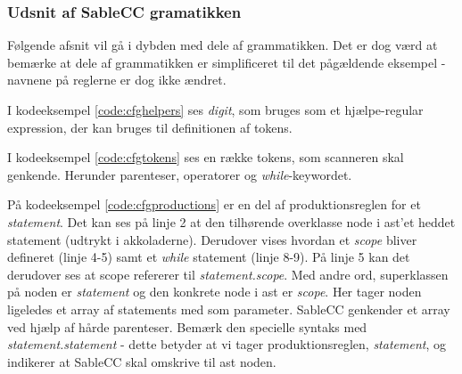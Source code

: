 \subsubsection*{Udsnit af SableCC gramatikken}
Følgende afsnit vil gå i dybden med dele af grammatikken. Det er dog værd at bemærke at dele af grammatikken er simplificeret til det pågældende eksempel - navnene på reglerne er dog ikke ændret.





\noindent I kodeeksempel \ref{code:cfghelpers} ses \textit{digit}, som bruges som et hjælpe-regular expression, der kan bruges til definitionen af tokens.


\noindent I kodeeksempel \ref{code:cfgtokens} ses en række tokens, som scanneren skal genkende. Herunder parenteser, operatorer og \textit{while}-keywordet.


\noindent På kodeeksempel \ref{code:cfgproductions} er en del af produktionsreglen for et \textit{statement}. Det kan ses på linje 2 at den tilhørende overklasse node i \gls{ast}'et heddet statement (udtrykt i akkoladerne). Derudover vises hvordan et \textit{scope} bliver defineret (linje 4-5) samt et \textit{while} statement (linje 8-9). På linje 5 kan det derudover ses at scope refererer til \textit{statement.scope}. Med andre ord, superklassen på noden er \textit{statement} og den konkrete node i \gls{ast} er \textit{scope}. Her tager noden ligeledes et array af statements med som parameter. SableCC genkender et array ved hjælp af hårde parenteser. Bemærk den specielle syntaks med \textit{statement.statement} - dette betyder at vi tager produktionsreglen, \textit{statement}, og indikerer at SableCC skal omskrive til \gls{ast} noden.

